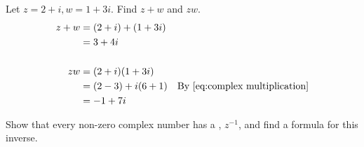 \documentclass[notoc,notitlepage]{tufte-book}
\begin{document}
\begin{eg}\label{eg:1}
	Let $z = 2 + i, w = 1 + 3i$. Find $z + w$ and $zw$.
	\begin{align*}
		z + w &= (2 + i) + (1 + 3i) \\
			  	&= 3 + 4i \\
			  	\\
		zw 		&= (2 + i)(1 + 3i) \\
					&= (2 - 3) + i (6 + 1) \quad \text{By } \cref{eq:complex multiplication}\\
					&= -1 + 7i
	\end{align*}
\end{eg}

\begin{eg}\label{eg:multiplicative inverse of a complex number}
	Show that every non-zero complex number has a , $z^{-1}$, and find a formula for this inverse.


\end{eg}
\end{document}
